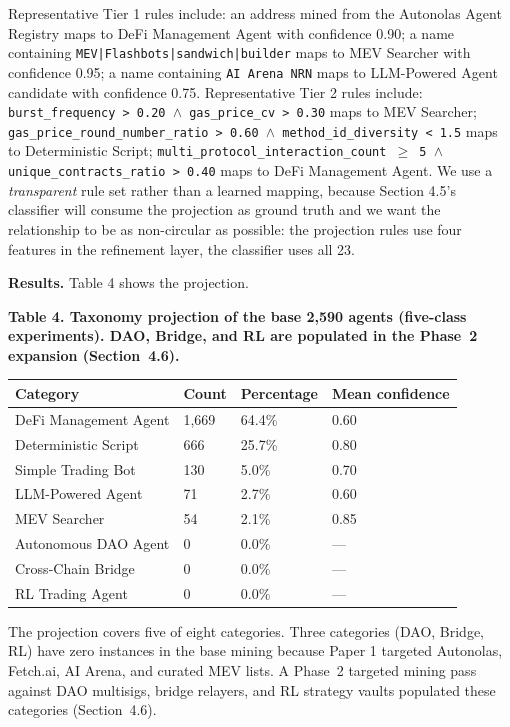 \documentclass[sigconf,nonacm=false]{acmart}
\begin{document}
Representative Tier 1 rules include: an address mined from the Autonolas Agent Registry maps to DeFi Management Agent with confidence 0.90; a name containing \texttt{MEV|Flashbots|sandwich|builder} maps to MEV Searcher with confidence 0.95; a name containing \texttt{AI Arena NRN} maps to LLM-Powered Agent candidate with confidence 0.75. Representative Tier 2 rules include: \texttt{burst\_frequency > 0.20 $\wedge$ gas\_price\_cv > 0.30} maps to MEV Searcher; \texttt{gas\_price\_round\_number\_ratio > 0.60 $\wedge$ method\_id\_diversity < 1.5} maps to Deterministic Script; \texttt{multi\_protocol\_interaction\_count $\geq$ 5 $\wedge$ unique\_contracts\_ratio > 0.40} maps to DeFi Management Agent. We use a \textit{transparent} rule set rather than a learned mapping, because Section 4.5's classifier will consume the projection as ground truth and we want the relationship to be as non-circular as possible: the projection rules use four features in the refinement layer, the classifier uses all 23.

\textbf{Results.} Table 4 shows the projection.

\textbf{Table 4. Taxonomy projection of the base 2,590 agents (five-class experiments). DAO, Bridge, and RL are populated in the Phase~2 expansion (Section~4.6).}

\begin{table}[h]
\centering
\small
\begin{tabular}{llll}
\toprule
Category & Count & Percentage & Mean confidence \\
\midrule
DeFi Management Agent & 1,669 & 64.4\% & 0.60 \\
Deterministic Script & 666 & 25.7\% & 0.80 \\
Simple Trading Bot & 130 & 5.0\% & 0.70 \\
LLM-Powered Agent & 71 & 2.7\% & 0.60 \\
MEV Searcher & 54 & 2.1\% & 0.85 \\
Autonomous DAO Agent & 0 & 0.0\% & --- \\
Cross-Chain Bridge & 0 & 0.0\% & --- \\
RL Trading Agent & 0 & 0.0\% & --- \\
\bottomrule
\end{tabular}
\end{table}

The projection covers five of eight categories. Three categories (DAO, Bridge, RL) have zero instances in the base mining because Paper 1 targeted Autonolas, Fetch.ai, AI Arena, and curated MEV lists. A Phase~2 targeted mining pass against DAO multisigs, bridge relayers, and RL strategy vaults populated these categories (Section~4.6).
\end{document}
